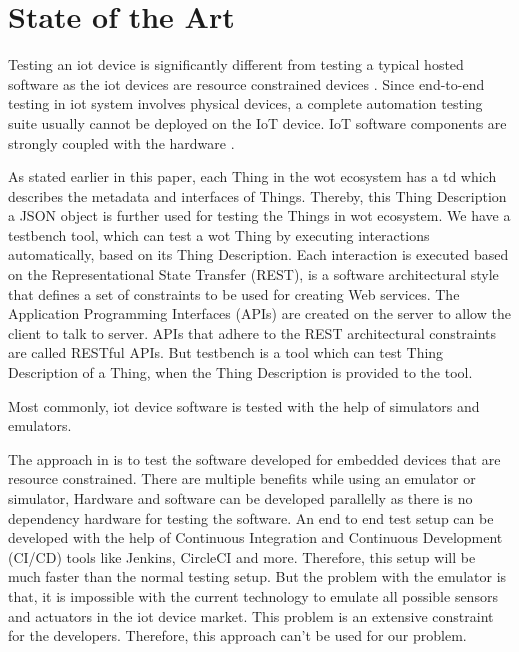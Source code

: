 \documentclass[conference]{IEEEtran}
\theoremstyle{definition}
\begin{document}
\section{State of the Art}

Testing an \ac{iot} device is significantly different from testing a typical hosted software as the \ac{iot} devices are resource constrained devices \cite{bormann2014terminology}. 
Since end-to-end testing in \ac{iot} system involves physical devices, a complete automation testing suite usually cannot be deployed on the IoT device. 
IoT software components are strongly coupled with the hardware \cite{rosenkranz2015distributed}.

As stated earlier in this paper, each Thing in the \ac{wot} ecosystem has a \ac{td} which describes the metadata and interfaces of Things. 
Thereby, this Thing Description a JSON object is further used for testing the Things in \ac{wot} ecosystem. 
We have a testbench tool, which can test a \ac{wot} Thing by executing interactions automatically, based on its Thing Description. 
Each interaction is executed based on the Representational State Transfer (REST), is a software architectural style that defines a set of constraints to be used for creating Web services. 
The Application Programming Interfaces (APIs) are created on the server to allow the client to talk to server. APIs that adhere to the REST architectural constraints are called RESTful APIs. 
But testbench is a tool which can test Thing Description of a Thing, when the Thing Description is provided to the tool.

Most commonly, \ac{iot} device software is tested with the help of simulators and emulators. 

The approach in \cite{karlesky2007mocking} is to test the software developed for embedded devices that are resource constrained. 
There are multiple benefits while using an emulator or simulator, Hardware and software can be developed parallelly as there is no dependency hardware for testing the software. 
An end to end test setup can be developed with the help of Continuous Integration and Continuous Development (CI/CD) tools like Jenkins, CircleCI and more. 
Therefore, this setup will be much faster than the normal testing setup. 
But the problem with the emulator is that, it is impossible with the current technology to emulate all possible sensors and actuators in the \ac{iot} device market. 
This problem is an extensive constraint for the developers. 
Therefore, this approach can’t be used for our problem.
\end{document}
